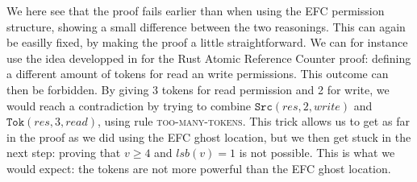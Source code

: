 We here see that the proof fails earlier than when using the EFC permission structure, showing a small difference between the two reasonings. This can again be easilly fixed, by making the proof a little straightforward. We can for instance use the idea developped in \cite{pascal} for the Rust Atomic Reference Counter proof: defining a different amount of tokens for read an write permissions. This outcome can then be forbidden. By giving 3 tokens for read permission and 2 for write, we would reach a contradiction by trying to combine  $\texttt{Src}(res, 2, write)$ and $\texttt{Tok}(res, 3, read)$, using rule \textsc{too-many-tokens}. This trick allows us to get as far in the proof as we did using the EFC ghost location, but we then get stuck in the next step: proving that $v \geq 4$ and $lsb(v) = 1$ is not possible. This is what we would expect: the tokens are not more powerful than the EFC ghost location.
